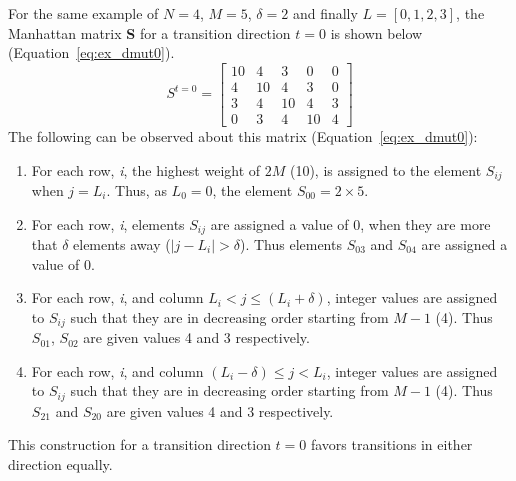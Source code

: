For the same example of $N = 4$, $M = 5$, $\delta = 2$ and finally $L = [0,1,2,3]$, the Manhattan matrix \textbf{S} for a transition direction $t = 0$ is shown below (Equation~\eqref{eq:ex_dmut0}).
\begin{equation}
    S^{t = 0} = \left[
     \begin{array}{ccccc}
       10 & 4 & 3 & 0 & 0 \\
       4 & 10 & 4 & 3 & 0 \\
       3 & 4 & 10 & 4 & 3 \\
       0 & 3 & 4 & 10 & 4
     \end{array}
   \right]
\label{eq:ex_dmut0}
\end{equation}
The following can be observed about this matrix (Equation~\eqref{eq:ex_dmut0}):
\begin{enumerate}
\item For each row, \textit{i}, the highest weight of $2M$ (10), is assigned to the element $S_{ij}$ when $j = L_i$. Thus, as $L_0 = 0$, the element $S_{00} = 2 \times 5$.
\item For each row, \textit{i}, elements $S_{ij}$ are assigned a value of 0, when they are more that $\delta$ elements away ($|j - L_i| > \delta$). Thus elements $S_{03}$ and $S_{04}$
are assigned a value of 0.
\item For each row, \textit{i}, and column $L_i < j \leq (L_i + \delta)$, integer values are assigned to $S_{ij}$ such that they are in decreasing order starting from $M-1$ (4).
Thus $S_{01}$, $S_{02}$ are given values 4 and 3 respectively. 
\item For each row, \textit{i}, and column $(L_i - \delta) \leq j < L_i$, integer values are assigned to $S_{ij}$ such that they are in decreasing order starting from $M-1$ (4).
Thus $S_{21}$ and $S_{20}$ are given values 4 and 3 respectively.
\end{enumerate}
This construction for a transition direction $t = 0$ favors transitions in either direction equally. 

